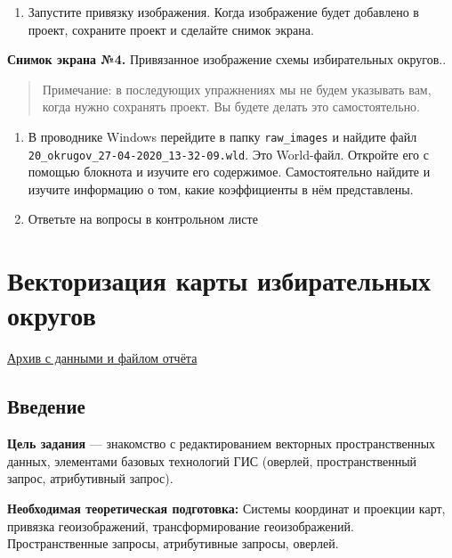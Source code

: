 \documentclass[
  12pt,
]{book}
\providecommand{\tightlist}{%
  \setlength{\itemsep}{0pt}\setlength{\parskip}{0pt}}
\begin{document}
\begin{enumerate}
\def\labelenumi{\arabic{enumi}.}
\setcounter{enumi}{10}
\tightlist
\item
  Запустите привязку изображения. Когда изображение будет добавлено в проект, сохраните проект и сделайте снимок экрана.
\end{enumerate}

\textbf{Снимок экрана №4.} Привязанное изображение схемы избирательных округов..

\begin{quote}
Примечание: в последующих упражнениях мы не будем указывать вам, когда нужно сохранять проект. Вы будете делать это самостоятельно.
\end{quote}

\begin{enumerate}
\def\labelenumi{\arabic{enumi}.}
\setcounter{enumi}{11}
\item
  В проводнике Windows перейдите в папку \texttt{raw\_images} и найдите файл \texttt{20\_okrugov\_27-04-2020\_13-32-09.wld}. Это World-файл. Откройте его с помощью блокнота и изучите его содержимое. Самостоятельно найдите и изучите информацию о том, какие коэффициенты в нём представлены.
\item
  Ответьте на вопросы в контрольном листе
\end{enumerate}

\hypertarget{digitizing-districts}{%
\chapter{Векторизация карты избирательных округов}\label{digitizing-districts}}

\href{https://1drv.ms/u/s!AmtmZDq3JgxHgZtz3mcQqknItl3Gyw?e=TR90KB}{Архив с данными и файлом отчёта}

\hypertarget{digitizing-intro}{%
\section{Введение}\label{digitizing-intro}}

\textbf{Цель задания} --- знакомство с редактированием векторных пространственных данных, элементами базовых технологий ГИС (оверлей, пространственный запрос, атрибутивный запрос).

\textbf{Необходимая теоретическая подготовка:} Системы координат и проекции карт, привязка геоизображений, трансформирование геоизображений. Пространственные запросы, атрибутивные запросы, оверлей.
\end{document}
